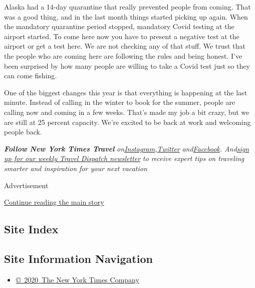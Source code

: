 Alaska had a 14-day quarantine that really prevented people from coming.
That was a good thing, and in the last month things started picking up
again. When the mandatory quarantine period stopped, mandatory Covid
testing at the airport started. To come here now you have to present a
negative test at the airport or get a test here. We are not checking any
of that stuff. We trust that the people who are coming here are
following the rules and being honest. I've been surprised by how many
people are willing to take a Covid test just so they can come fishing.

One of the biggest changes this year is that everything is happening at
the last minute. Instead of calling in the winter to book for the
summer, people are calling now and coming in a few weeks. That's made my
job a bit crazy, but we are still at 25 percent capacity. We're excited
to be back at work and welcoming people back.

\emph{\textbf{Follow New York Times Travel}}
\emph{on}\href{https://www.instagram.com/nytimestravel/}{\emph{Instagram}}\emph{,}\href{https://twitter.com/nytimestravel}{\emph{Twitter}}
\emph{and}\href{https://www.facebookcorewwwi.onion/nytimestravel/}{\emph{Facebook}}\emph{.
And}\href{https://www.nytimes3xbfgragh.onion/newsletters/traveldispatch}{\emph{sign
up for our weekly Travel Dispatch newsletter}} \emph{to receive expert
tips on traveling smarter and inspiration for your next vacation}

Advertisement

\protect\hyperlink{after-bottom}{Continue reading the main story}

\hypertarget{site-index}{%
\subsection{Site Index}\label{site-index}}

\hypertarget{site-information-navigation}{%
\subsection{Site Information
Navigation}\label{site-information-navigation}}

\begin{itemize}
\tightlist
\item
  \href{https://help.nytimes3xbfgragh.onion/hc/en-us/articles/115014792127-Copyright-notice}{©~2020~The
  New York Times Company}
\end{itemize}

